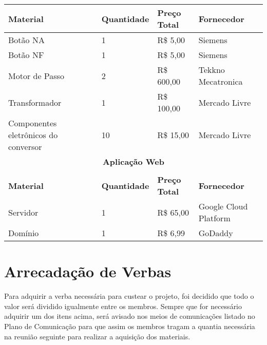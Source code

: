 \begin{table}[!h]
\begin{tabular}{|l|l|l|l|}
\textbf{Material}                    & \textbf{Quantidade} & \textbf{Preço Total} & {\textbf{Fornecedor}}   \\ \hline
Botão NA                             & 1                   & R\$ 5,00             & {Siemens}               \\
Botão NF                             & 1                   & R\$ 5,00             & {Siemens}               \\
Motor de Passo                       & 2                   & R\$ 600,00           & {Tekkno Mecatronica}    \\
Transformador                        & 1                   & R\$ 100,00           & {Mercado Livre}         \\
Componentes eletrônicos do conversor & 10                  & R\$ 15,00            & {Mercado Livre}          \\ \hline
\multicolumn{5}{c}{\textbf{Aplicação Web}} \\ \hline                                                                                    \\
\textbf{Material}                    & \textbf{Quantidade} & \textbf{Preço Total} & {\textbf{Fornecedor}}   \\ \hline
Servidor                             & 1                   & R\$ 65,00            & {Google Cloud Platform} \\
Domínio                              & 1                   & R\$ 6,99             & {GoDaddy}              
\end{tabular}
\end{table}
\FloatBarrier

\section{Arrecadação de Verbas}
Para adquirir a verba necessária para custear o projeto, foi decidido que todo o valor será dividido igualmente entre os membros. Sempre que for necessário adquirir um dos itens acima, será avisado nos meios de comunicações listado no Plano de Comunicação para que assim os membros tragam a quantia necessária na reunião seguinte para realizar a aquisição dos materiais.
